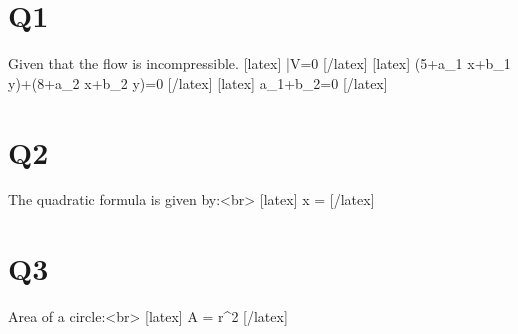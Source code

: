 \section*{Q1}
Given that the flow is incompressible.
[latex] \therefore \quad \operatorname \bar{V}=0 [/latex]
[latex] \left(5+a_{1} x+b_{1} y\right)+\left(8+a_{2} x+b_{2} y\right)=0 [/latex]
[latex] a_{1}+b_{2}=0 [/latex]

\section*{Q2}
The quadratic formula is given by:<br>
[latex] x =  [/latex]

\section*{Q3}
Area of a circle:<br>
[latex] A = \pi r^2 [/latex]
